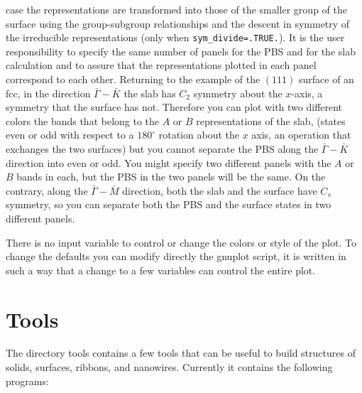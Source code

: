 \documentclass[12pt,a4paper]{article}
\begin{document}
case the representations are transformed into those of the smaller
group of the surface using the group-subgroup relationships and
the descent in symmetry of the irreducible representations
(only when \texttt{sym\_divide=.TRUE.}).
It is the user responsibility to specify the same number of panels
for the PBS and for the slab calculation and to assure that the
representations plotted in each panel correspond to each other.
Returning to the example of the $(111)$ surface of an fcc, in the direction
$\bar \Gamma-\bar K$ the slab has $C_2$ symmetry about the $x$-axis, a symmetry
that the surface has not. Therefore you can plot with two different colors
the bands that belong to the $A$ or $B$ representations of the slab,
(states even or odd with respect to a $180^\circ$ rotation about
the $x$ axis, an operation that exchanges the two surfaces)
but you cannot separate the PBS along the $\bar \Gamma-\bar K$ direction into
even or odd. You might specify two different panels with the
$A$ or $B$ bands in each, but the PBS in the two panels will be the same. 
On the contrary, along the $\bar \Gamma-\bar M$ direction, both the slab and 
the surface have $C_s$ symmetry, so you can separate both the PBS 
and the surface states in two different panels.

There is no input variable to control or change the colors or style of the 
plot. To change the defaults you can modify directly the gnuplot script,
it is written in such a way that a change to a few variables can
control the entire plot.

\section{Tools}

The directory tools contains a few tools that can be useful to build
structures of solids, surfaces, ribbons, and nanowires. Currently it contains
the following programs:
\end{document}
